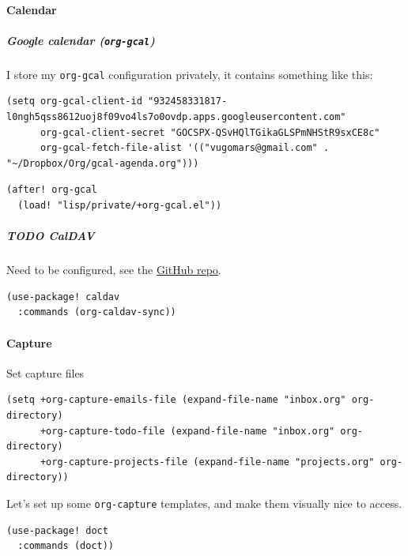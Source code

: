 \documentclass[11pt]{article}
\begin{document}
\paragraph{Calendar}
\label{sec:org45e863c}
\subparagraph{Google calendar (\texttt{org-gcal})}
\label{sec:org6c396da}
I store my \texttt{org-gcal} configuration privately, it contains something like this:

\begin{verbatim}
(setq org-gcal-client-id "932458331817-l0ngh5qss8612uoj8f09vo4ls7o0ovdp.apps.googleusercontent.com"
      org-gcal-client-secret "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"
      org-gcal-fetch-file-alist '(("vugomars@gmail.com" . "~/Dropbox/Org/gcal-agenda.org")))
\end{verbatim}

\begin{verbatim}
(after! org-gcal
  (load! "lisp/private/+org-gcal.el"))
\end{verbatim}

\subparagraph{{\bfseries\sffamily TODO} CalDAV}
\label{sec:org5c85ea0}
Need to be configured, see the \href{https://github.com/dengste/org-caldav}{GitHub repo}.

\begin{verbatim}
(use-package! caldav
  :commands (org-caldav-sync))
\end{verbatim}

\paragraph{Capture}
\label{sec:org4551c52}
Set capture files

\begin{verbatim}
(setq +org-capture-emails-file (expand-file-name "inbox.org" org-directory)
      +org-capture-todo-file (expand-file-name "inbox.org" org-directory)
      +org-capture-projects-file (expand-file-name "projects.org" org-directory))
\end{verbatim}

Let's set up some \texttt{org-capture} templates, and make them visually nice to access.

\begin{verbatim}
(use-package! doct
  :commands (doct))
\end{verbatim}
\end{document}

